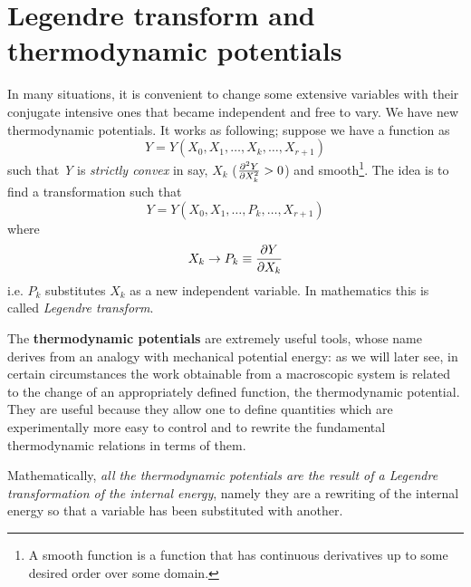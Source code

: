 \documentclass[../../Main/Main.tex]{subfiles}
\begin{document}
\section{Legendre transform and thermodynamic potentials}

In many situations, it is convenient to change some extensive variables with their conjugate intensive ones that became independent and free to vary. We have new thermodynamic potentials.
It works as following; suppose we have a function as
\begin{equation}
  Y=Y(X_0,X_1,\dots,X_k,\dots,X_{r+1})
\end{equation}
such that \emph{Y} is \emph{strictly convex} in say, \( X_k \) (\( \pdv[2]{Y}{X_k} > 0 \)) and smooth\footnote{A smooth function is a function that has continuous derivatives up to some desired order over some domain.}.
The idea is to find a transformation such that 
\begin{equation}
Y=Y(X_0,X_1,\dots,P_k,\dots,X_{r+1}) 
\end{equation}
where
\begin{equation}
  X_k \rightarrow P_k \equiv \pdv{Y}{X_k}
\end{equation}
i.e. \( P_k \) substitutes \( X_k \) as a new independent variable.
In mathematics this is called \textit{Legendre transform}.


The \textbf{thermodynamic potentials} are extremely useful tools, whose name derives from an analogy with mechanical potential energy: as we will later see, in certain circumstances the work obtainable from a macroscopic system is related to the change of an appropriately defined function, the thermodynamic potential. They are useful because they allow one to define quantities which are experimentally more easy to control and to rewrite the fundamental thermodynamic relations in terms of them.

Mathematically, \emph{all the thermodynamic potentials are the result of a Legendre transformation of the internal energy}, namely they are a rewriting of the internal energy so that a variable has been substituted with another.
\end{document}
